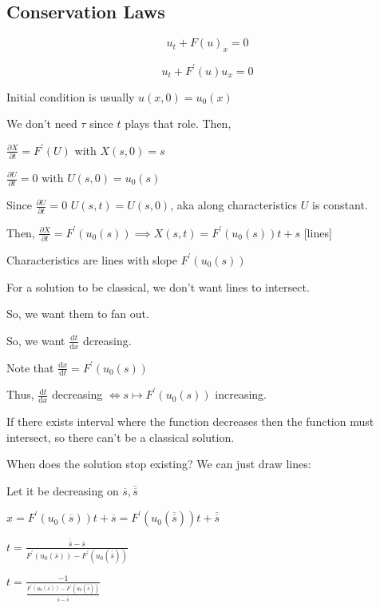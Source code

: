 \documentclass{article}
\theoremstyle{definition}
\begin{document}
\subsection*{Conservation Laws}

\[
    u_t + F(u)_x = 0
\]

\[
    u_t + F^{\prime}(u)u_x = 0
\]

Initial condition is usually \(u(x,0)=u_0(x)\) 

We don't need \(\tau\) since \(t\) plays that role. Then,

\(\frac{\partial X}{\partial t} = F^{\prime}(U)\) with \(X(s,0)=s\) 

\(\frac{\partial U}{\partial t} = 0\) with \(U(s,0)=u_0(s)\) 

Since \(\frac{\partial U}{\partial t} = 0\) \(U(s,t)=U(s,0)\), aka along characteristics \(U\) is constant.

Then, \(\frac{\partial X}{\partial t} = F^{\prime}(u_0(s)) \implies X(s,t)=F^{\prime} (u_0(s))t + s\) [lines]

Characteristics are lines with slope \(F^{\prime} (u_0(s))\) 

For a solution to be classical, we don't want lines to intersect.

So, we want them to fan out.

So, we want \(\frac{\mathrm{d}t}{\mathrm{d}x}\) dcreasing.

Note that \(\frac{\mathrm{d}x}{\mathrm{d}t} = F^{\prime}(u_0(s))\)

Thus, \(\frac{\mathrm{d}t}{\mathrm{d}x}\) decreasing \(\iff s \mapsto F^{\prime} (u_0(s))\) increasing.

If there exists interval where the function decreases then the function must intersect, so there can't be a classical solution.

When does the solution stop existing? We can just draw lines:

Let it be decreasing on \(\overline{s}, \overline{\overline{s}} \) 

\(x = F^{\prime}(u_0(\overline{s}))t + \overline{s} = F^{\prime} (u_0(\overline{\overline{s}}))t + \overline{\overline{s}}  \) 

\(t = \frac{\overline{\overline{s}} - \overline{s}}{F^{\prime} (u_0(\overline{s}))-F^{\prime}(u_0(\overline{\overline{s}}))}\) 

\(t = \frac{-1}{\frac{F^{\prime}(u_0(\overline{s}))-F^{\prime}(u_0(\overline{\overline{s}}))}{\overline{s} - \overline{\overline{s}}  }}\) 
\end{document}

